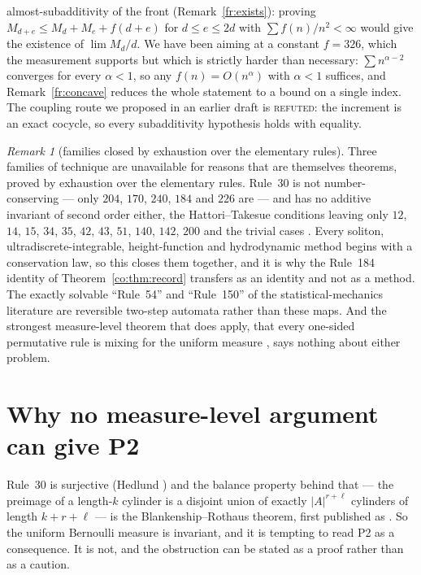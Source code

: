 \documentclass[11pt]{article}
\theoremstyle{definition}
\theoremstyle{remark}
\newtheorem{remark}[theorem]{Remark}
\begin{document}
\begin{enumerate}[nosep]
almost-subadditivity of the front (Remark~\ref{fr:exists}): proving
$M_{d+e}\le M_d+M_e+f(d+e)$ for $d\le e\le2d$ with $\sum f(n)/n^{2}<\infty$ would give the existence of
$\lim M_d/d$. We have been aiming at a constant $f=326$, which the measurement supports but which is
strictly harder than necessary: $\sum n^{\alpha-2}$ converges for every $\alpha<1$, so any
$f(n)=O(n^{\alpha})$ with $\alpha<1$ suffices, and Remark~\ref{fr:concave} reduces the whole statement to
a bound on a single index. The coupling route we
proposed in an earlier draft is \textsc{refuted}: the increment is an exact cocycle, so every
subadditivity hypothesis holds with equality.
\end{enumerate}

\begin{remark}[families closed by exhaustion over the elementary rules]\label{fr:closedfamilies}
Three families of technique are unavailable for reasons that are themselves theorems, proved by
exhaustion over the elementary rules. Rule~30 is not number-conserving --- only $204$, $170$, $240$,
$184$ and $226$ are \cite{BFuks} --- and has no additive invariant of second order either, the
Hattori--Takesue conditions leaving only $12$, $14$, $15$, $34$, $35$, $42$, $43$, $51$, $140$, $142$,
$200$ and the trivial cases \cite{Fuks05,HT}. Every soliton, ultradiscrete-integrable, height-function
and hydrodynamic method begins with a conservation law, so this closes them together, and it is why the
Rule~184 identity of Theorem~\ref{co:thm:record} transfers as an identity and not as a method. The
exactly solvable ``Rule~54'' and ``Rule~150'' of the statistical-mechanics literature \cite{BKP,WPG}
are reversible two-step automata rather than these maps. And the strongest measure-level theorem that
does apply, that every one-sided permutative rule is mixing for the uniform measure \cite{Kleveland},
says nothing about either problem.
\end{remark}

\section{Why no measure-level argument can give P2}\label{sec:p2}

Rule~30 is surjective (Hedlund \cite[Thm.~6.6]{Hedlund}) and the balance property behind that --- the
preimage of a length-$k$ cylinder is a disjoint union of exactly $|A|^{r+\ell}$ cylinders of length
$k+r+\ell$ --- is the Blankenship--Rothaus theorem, first published as \cite[Thm.~5.4]{Hedlund}. So the
uniform Bernoulli measure is invariant, and it is tempting to read P2 as a consequence. It is not, and
the obstruction can be stated as a proof rather than as a caution.
\end{document}
